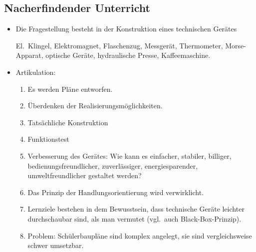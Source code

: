 \subsection{Nacherfindender Unterricht}
\begin{itemize}
\item Die Fragestellung besteht in der Konstruktion eines
technischen Ger\"{a}tes
\begin{beisp}
	El.\ Klingel, Elektromagnet, Flaschenzug,
Messger\"{a}t, Thermometer, Morse-Apparat, optische Ger\"{a}te,
hydraulische Presse, Kaffeemaschine.
\end{beisp}

\item Artikulation:
\begin{enumerate}
\item Es werden Pl\"{a}ne entworfen.
\item \"{U}berdenken der Realisierungsm\"{o}glichkeiten.
\item Tats\"{a}chliche Konstruktion
\item Funktionstest
\item Verbesserung des Ger\"{a}tes: Wie kann es einfacher, stabiler,
billiger, bedienungsfreundlicher, zuverl\"{a}ssiger, energiesparender,
umweltfreundlicher gestaltet werden?
\item Das Prinzip der Handlungsorientierung wird verwirklicht.
\item Lernziele bestehen in dem Bewusstsein, dass technische Ger\"{a}te
leichter durchschaubar sind, als man vermutet (vgl.\ auch
Black-Box-Prinzip).
\item Problem: Sch\"{u}lerbaupl\"{a}ne sind komplex angelegt, sie sind
vergleichsweise schwer umsetzbar.
\end{enumerate}
\end{itemize}


